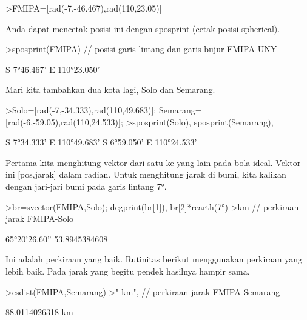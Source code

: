 \documentclass[a4paper,10pt]{article}
\begin{document}
\begin{eulernotebook}
\begin{eulercomment}
\begin{eulercomment}
\begin{eulerprompt}
>FMIPA=[rad(-7,-46.467),rad(110,23.05)]
\end{eulerprompt}
\begin{euleroutput}
  [-0.13569,  1.92657]
\end{euleroutput}
\begin{eulercomment}
Anda dapat mencetak posisi ini dengan sposprint (cetak posisi
spherical).
\end{eulercomment}
\begin{eulerprompt}
>sposprint(FMIPA) // posisi garis lintang dan garis bujur FMIPA UNY
\end{eulerprompt}
\begin{euleroutput}
  S 7°46.467' E 110°23.050'
\end{euleroutput}
\begin{eulercomment}
Mari kita tambahkan dua kota lagi, Solo dan Semarang.
\end{eulercomment}
\begin{eulerprompt}
>Solo=[rad(-7,-34.333),rad(110,49.683)]; Semarang=[rad(-6,-59.05),rad(110,24.533)];
>sposprint(Solo), sposprint(Semarang),
\end{eulerprompt}
\begin{euleroutput}
  S 7°34.333' E 110°49.683'
  S 6°59.050' E 110°24.533'
\end{euleroutput}
\begin{eulercomment}
Pertama kita menghitung vektor dari satu ke yang lain pada bola ideal.
Vektor ini [pos,jarak] dalam radian. Untuk menghitung jarak di bumi,
kita kalikan dengan jari-jari bumi pada garis lintang 7°.
\end{eulercomment}
\begin{eulerprompt}
>br=svector(FMIPA,Solo); degprint(br[1]), br[2]*rearth(7°)->km // perkiraan jarak FMIPA-Solo
\end{eulerprompt}
\begin{euleroutput}
  65°20'26.60''
  53.8945384608
\end{euleroutput}
\begin{eulercomment}
Ini adalah perkiraan yang baik. Rutinitas berikut menggunakan
perkiraan yang lebih baik. Pada jarak yang begitu pendek hasilnya
hampir sama.
\end{eulercomment}
\begin{eulerprompt}
>esdist(FMIPA,Semarang)->" km", // perkiraan jarak FMIPA-Semarang
\end{eulerprompt}
\begin{euleroutput}
  88.0114026318 km
\end{euleroutput}

\end{eulercomment}
\end{eulercomment}
\end{eulernotebook}
\end{document}
